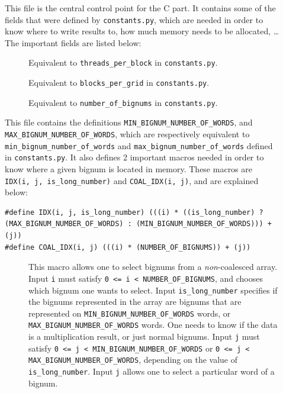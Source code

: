 \documentclass[10pt, a4paper]{report}
\begin{document}
\begin{description}
\item[]
This file is the central control point for the C part.
It contains some of the fields that were defined by \verb+constants.py+, which
are needed in order to know where to write results to, how much memory needs to
be allocated, \ldots
The important fields are listed below:

\begin{description}
\item[] Equivalent to \verb+threads_per_block+ in
\verb+constants.py+.
\item[] Equivalent to \verb+blocks_per_grid+ in
\verb+constants.py+.
\item[] Equivalent to \verb+number_of_bignums+ in
\verb+constants.py+.
\end{description}

\item[]
This file contains the definitions \verb+MIN_BIGNUM_NUMBER_OF_WORDS+, and
\verb+MAX_BIGNUM_NUMBER_OF_WORDS+, which are respectively equivalent to
\verb+min_bignum_number_of_words+ and \verb+max_bignum_number_of_words+ defined
in \verb+constants.py+.
It also defines 2 important macros needed in order to know where a given bignum
is located in memory.
These macros are \verb+IDX(i, j, is_long_number)+ and \verb+COAL_IDX(i, j)+, and
are explained below:

\begin{lstlisting}
#define IDX(i, j, is_long_number) (((i) * ((is_long_number) ? (MAX_BIGNUM_NUMBER_OF_WORDS) : (MIN_BIGNUM_NUMBER_OF_WORDS))) + (j))
#define COAL_IDX(i, j) (((i) * (NUMBER_OF_BIGNUMS)) + (j))
\end{lstlisting}

\begin{description}
\item[] This macro allows one to select bignums
from a \emph{non}-coalesced array.
Input \verb+i+ must satisfy
\verb+0 <= i < NUMBER_OF_BIGNUMS+, and chooses which bignum one wants to select.
Input \verb+is_long_number+ specifies if the bignums represented in the array
are bignums that are represented on \verb+MIN_BIGNUM_NUMBER_OF_WORDS+ words,
or \verb+MAX_BIGNUM_NUMBER_OF_WORDS+ words.
One needs to know if the data is a multiplication result, or just normal
bignums.
Input \verb+j+ must satisfy
\verb+0 <= j < MIN_BIGNUM_NUMBER_OF_WORDS+ or
\verb+0 <= j < MAX_BIGNUM_NUMBER_OF_WORDS+, depending on the value of
\verb+is_long_number+.
Input \verb+j+ allows one to select a particular word of a bignum.


\end{description}
\end{description}
\end{document}
